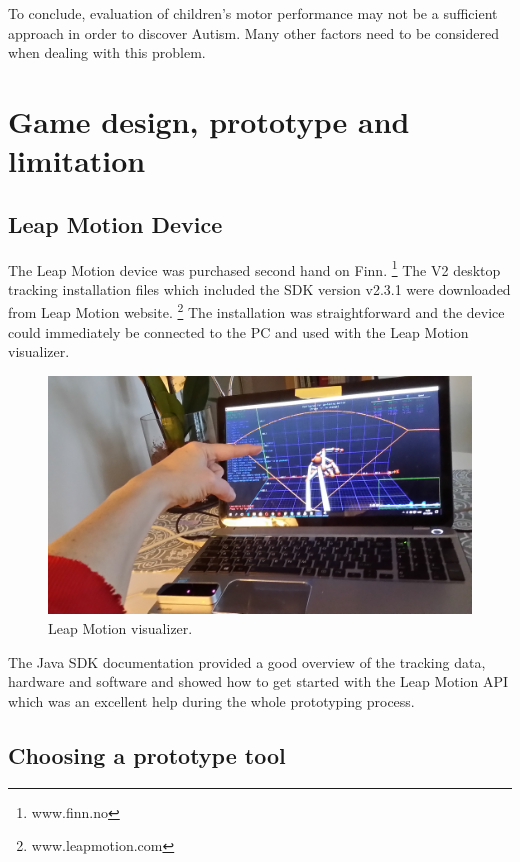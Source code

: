To conclude, evaluation of children's motor performance may not be a sufficient approach in order to discover Autism. Many other factors need to be considered when dealing with this problem. 



\section{Game design, prototype and limitation}
\label{sec:prototype}


\subsection{Leap Motion Device}

The Leap Motion device was purchased second hand on Finn. \footnote{www.finn.no} The V2 desktop tracking installation files which included the SDK version v2.3.1 were downloaded from Leap Motion website. \footnote{ www.leapmotion.com} The installation was straightforward and the device could immediately be connected to the PC and used with the Leap Motion visualizer.

\begin{figure}[h]  %
  \centering
  \includegraphics[width=.5\textwidth]{figures/LMvisualizer.jpg}
  \caption[Leap Motion visualizer.]{Leap Motion visualizer.}
  \label{fig:LMvisualizer}
\end{figure}

The Java SDK documentation provided a good overview of the tracking data, hardware and software and showed how to get started with the Leap Motion API which was an excellent help during the whole prototyping process.

\subsection{Choosing a prototype tool}


